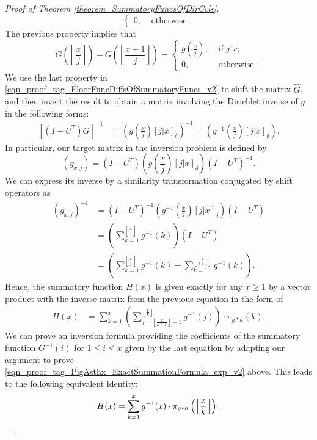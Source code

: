 \documentclass[11pt,reqno,a4letter]{article}
\numberwithin{figure}{section}
\numberwithin{table}{section}
\newcommand{\Iverson}[1]{\ensuremath{\left[#1\right]_{\delta}}}
\newcommand{\floor}[1]{\left\lfloor #1 \right\rfloor}
\newcommand{\Floor}[2]{\ensuremath{\left\lfloor \frac{#1}{#2} \right\rfloor}}
\theoremstyle{plain}
\numberwithin{theorem}{section}
\theoremstyle{definition}
\begin{document}
\begin{proof}[Proof of Theorem \ref{theorem_SummatoryFuncsOfDirCvls}]
\[\begin{cases}
     0, & \text{ otherwise. } 
     \end{cases} 
\] 
The previous property implies that 
\begin{equation} 
\label{eqn_proof_tag_FloorFuncDiffsOfSummatoryFuncs_v2} 
G\left(\floor{\frac{x}{j}}\right) - G\left(\floor{\frac{x-1}{j}}\right) = 
     \begin{cases} 
     g\left(\frac{x}{j}\right), & \text{ if $j | x$; } \\ 
     0, & \text{ otherwise. } 
     \end{cases}
\end{equation} 
We use the last property in \eqref{eqn_proof_tag_FloorFuncDiffsOfSummatoryFuncs_v2} 
to shift the matrix $\hat{G}$, and then invert the result to obtain a matrix involving the 
Dirichlet inverse of $g$ in the following forms: 
\begin{align*} 
\left[(I-U^{T}) \hat{G}\right]^{-1} & = \left(g\left(\frac{x}{j}\right) \Iverson{j|x}\right)^{-1} = 
     \left(g^{-1}\left(\frac{x}{j}\right) \Iverson{j|x}\right). 
\end{align*} 
In particular, our target matrix in the inversion problem is defined by 
$$(g_{x,j}) = (I-U^{T}) \left(g\left(\frac{x}{j}\right) \Iverson{j|x}\right) (I-U^{T})^{-1}.$$
We can express its inverse by a similarity transformation conjugated by shift operators as 
\begin{align*} 
(g_{x,j})^{-1} & = (I-U^{T})^{-1} \left(g^{-1}\left(\frac{x}{j}\right) \Iverson{j|x}\right) (I-U^{T}) \\ 
     & = \left(\sum_{k=1}^{\floor{\frac{x}{j}}} g^{-1}(k)\right) (I-U^{T}) \\ 
     & = \left(\sum_{k=1}^{\floor{\frac{x}{j}}} g^{-1}(k) - \sum_{k=1}^{\floor{\frac{x}{j+1}}} g^{-1}(k)\right). 
\end{align*} 
Hence, the summatory function $H(x)$ is given exactly for any $x \geq 1$ 
by a vector product with the inverse matrix from the previous equation in the form of 
\begin{align*} 
H(x) & = \sum_{k=1}^x \left(\sum_{j=\floor{\frac{x}{k+1}}+1}^{\floor{\frac{x}{k}}} g^{-1}(j)\right) 
     \cdot \pi_{g \ast h}(k). 
\end{align*} 
We can prove an inversion formula providing the coefficients of the summatory function 
$G^{-1}(i)$ for $1 \leq i \leq x$ given 
by the last equation by adapting our argument to prove 
\eqref{eqn_proof_tag_PigAsthx_ExactSummationFormula_exp_v2} above. 
This leads to the following equivalent identity: 
\[
H(x) = \sum_{k=1}^{x} g^{-1}(x) \cdot \pi_{g \ast h}\left(\Floor{x}{k}\right). 
     \qedhere 
\]
\end{proof} 
\end{document}
